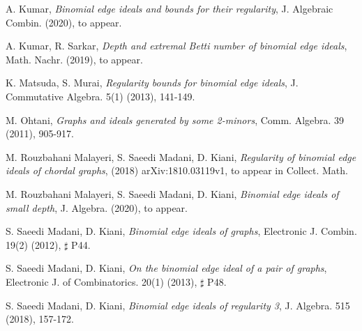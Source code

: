 \documentclass[12pt]{amsart}
\begin{document}
\begin{thebibliography}{99}
 A. Kumar, {\em Binomial edge ideals and bounds for their regularity}, J. Algebraic Combin. (2020), to appear.

 A. Kumar, R. Sarkar, {\em Depth and extremal Betti number of binomial edge ideals}, Math. Nachr. (2019), to appear. 
		

 K. Matsuda, S. Murai, {\em Regularity bounds for binomial edge ideals}, J. Commutative Algebra. 5(1) (2013), 141-149.

 M. Ohtani, {\em Graphs and ideals generated by some 2-minors}, Comm. Algebra. 39 (2011), 905-917.
		

		
 M. Rouzbahani Malayeri, S. Saeedi Madani, D. Kiani, {\em Regularity of binomial edge ideals of chordal graphs}, (2018) arXiv:1810.03119v1, to appear in Collect. Math.
		
 M. Rouzbahani Malayeri, S. Saeedi Madani, D. Kiani, {\em Binomial edge ideals of small depth}, J. Algebra.  (2020), to appear. 		
		
		
		
 S. Saeedi Madani, D. Kiani, {\em Binomial edge ideals of graphs}, Electronic J. Combin. 19(2) (2012), $\sharp$ P44.
		
 S. Saeedi Madani, D. Kiani, {\em On the binomial edge ideal of a pair of graphs}, Electronic J. of Combinatorics. 20(1) (2013), $\sharp$ P48.
		
 S. Saeedi Madani, D. Kiani, {\em Binomial edge ideals of regularity 3}, J. Algebra. 515 (2018), 157-172.
	

		
		
	\end{thebibliography}
\end{document}
